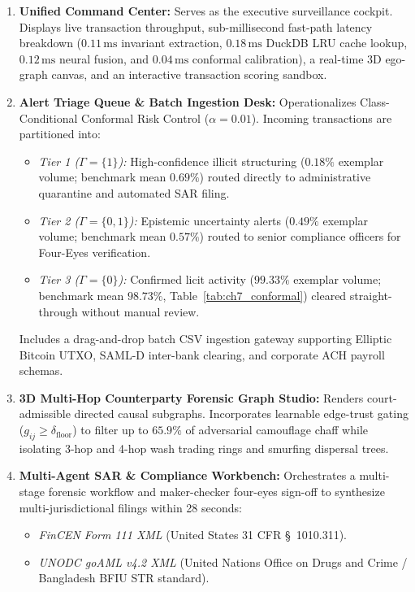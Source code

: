 \begin{enumerate}
    \item \textbf{Unified Command Center:} Serves as the executive surveillance cockpit. Displays live transaction throughput, sub-millisecond fast-path latency breakdown ($0.11\,\text{ms}$ invariant extraction, $0.18\,\text{ms}$ DuckDB LRU cache lookup, $0.12\,\text{ms}$ neural fusion, and $0.04\,\text{ms}$ conformal calibration), a real-time 3D ego-graph canvas, and an interactive transaction scoring sandbox.
    \item \textbf{Alert Triage Queue \& Batch Ingestion Desk:} Operationalizes Class-Conditional Conformal Risk Control ($\alpha=0.01$). Incoming transactions are partitioned into:
    \begin{itemize}
        \item \textit{Tier 1 ($\Gamma=\{1\}$):} High-confidence illicit structuring ($0.18\%$ exemplar volume; benchmark mean $0.69\%$) routed directly to administrative quarantine and automated SAR filing.
        \item \textit{Tier 2 ($\Gamma=\{0, 1\}$):} Epistemic uncertainty alerts ($0.49\%$ exemplar volume; benchmark mean $0.57\%$) routed to senior compliance officers for Four-Eyes verification.
        \item \textit{Tier 3 ($\Gamma=\{0\}$):} Confirmed licit activity ($99.33\%$ exemplar volume; benchmark mean $98.73\%$, Table~\ref{tab:ch7_conformal}) cleared straight-through without manual review.
    \end{itemize}
    Includes a drag-and-drop batch CSV ingestion gateway supporting Elliptic Bitcoin UTXO, SAML-D inter-bank clearing, and corporate ACH payroll schemas.
    \item \textbf{3D Multi-Hop Counterparty Forensic Graph Studio:} Renders court-admissible directed causal subgraphs. Incorporates learnable edge-trust gating ($g_{ij} \ge \delta_{\text{floor}}$) to filter up to $65.9\%$ of adversarial camouflage chaff while isolating 3-hop and 4-hop wash trading rings and smurfing dispersal trees.
    \item \textbf{Multi-Agent SAR \& Compliance Workbench:} Orchestrates a multi-stage forensic workflow and maker-checker four-eyes sign-off to synthesize multi-jurisdictional filings within 28 seconds:
    \begin{itemize}
        \item \textit{FinCEN Form 111 XML} (United States 31 CFR \S\ 1010.311).
        \item \textit{UNODC goAML v4.2 XML} (United Nations Office on Drugs and Crime / Bangladesh BFIU STR standard).

\end{itemize}
\end{enumerate}
